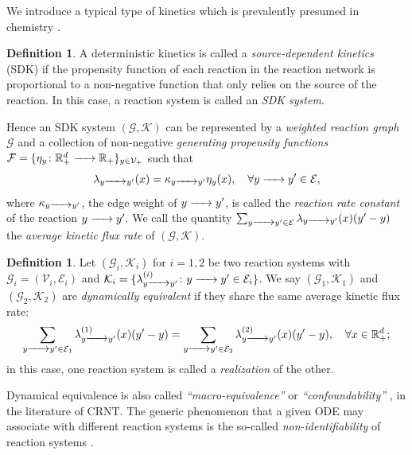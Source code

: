 \documentclass[10pt]{amsart}
\numberwithin{equation}{section}
\theoremstyle{plain}
\theoremstyle{definition}
\newtheorem{definition}[theorem]{Definition}
\theoremstyle{remark}
\newcommand{\cE}{\mathcal{E}}
\newcommand{\cG}{\mathcal{G}}
\newcommand{\cK}{\mathcal{K}}
\newcommand{\cV}{\mathcal{V}}
\begin{document}
We introduce a typical type of kinetics  
which is prevalently presumed in chemistry \cite{T90}.
\begin{definition}\label{def:source-dependent-kinetics}
A deterministic kinetics is called a \emph{source-dependent kinetics} (SDK) if the propensity function of each reaction in the reaction network is proportional to a non-negative function that only relies on the source of the reaction. In this case, a reaction system is called an \emph{SDK system}.

Hence an SDK system $(\cG,\cK)$ can be represented by a \emph{weighted reaction graph} $\cG$ and a collection of non-negative \emph{generating  propensity functions} $\mathcal{F}=\{\eta_y\colon \mathbb{R}^d_+\ce{->[]} \mathbb{R}_+\}_{y\in\cV_+}$ such that
\[\lambda_{y\ce{->[]} y'}(x) = \kappa_{y\ce{->[]} y'}\eta_y(x),\quad \forall y\ce{->[]} y'\in\cE,\]
where $\kappa_{y\ce{->[]} y'}$, the edge weight of $y\ce{->[]} y'$, is called the \emph{reaction rate constant} of the reaction $y\ce{->[]} y'$. We call the quantity $\sum_{y\ce{->[]} y'\in\mathcal{E}}\lambda_{y\ce{->[]} y'}(x)(y'-y)$ the \emph{average kinetic flux rate} of $(\cG,\cK)$.
\end{definition}
\begin{definition}\label{def:dynamical_equivalence}
Let $(\cG_i,\mathcal{K}_i)$ for $i=1,2$ be two reaction systems with  $\cG_i=(\cV_i,\cE_i)$ and $\mathcal{K}_i=\{\lambda_{y\ce{->[]} y'}^{(i)}\colon y\ce{->[]} y'\in\mathcal{E}_i\}$. We say $(\cG_1,\mathcal{K}_1)$ and $(\cG_2,\mathcal{K}_2)$ are \emph{dynamically equivalent} if they share the same average kinetic flux rate:
\begin{equation}\label{eq:overall-flux}
\sum_{y\ce{->[]} y'\in\mathcal{E}_1}\lambda^{(1)}_{y\ce{->[]} y'}(x)(y'-y)= \sum_{y\ce{->[]} y'\in\mathcal{E}_2}\lambda^{(2)}_{y\ce{->[]} y'}(x)(y'-y),\quad \forall x\in\mathbb{R}^d_+;
\end{equation} in this case, one reaction system is called a  \emph{realization} of the other. \end{definition}

 Dynamical equivalence is also called \emph{``macro-equivalence''} \cite{HJ72} or \emph{``confoundability''} \cite{CP08}, in the literature of CRNT. The generic phenomenon that a given ODE may associate with  different reaction systems is the so-called \emph{non-identifiability} of reaction systems \cite{CP08}.
\end{document}
